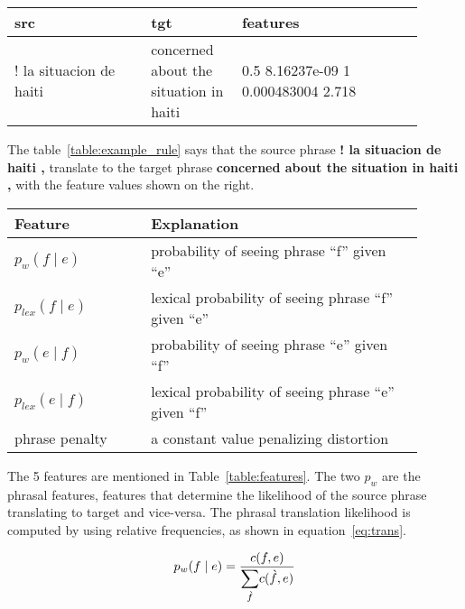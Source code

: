 \begin{table*}[ht]
\small
\small
\centering
\begin{tabular}{p{0.3\linewidth}p{0.2\linewidth}p{0.4\linewidth}}
\toprule
src & tgt & features \\
\toprule
! la situacion de haiti & concerned about the situation in haiti & 0.5 8.16237e-09 1 0.000483004 2.718 \\
\bottomrule
\end{tabular}
\caption{Example of a phrase pair in the Haitian Kreyol to English table}
\label{table:example_rule}
\end{table*}

The table~\ref{table:example_rule}  says that the source phrase \textbf{! la situacion de haiti ,} translate to the target phrase \textbf{concerned about the situation in haiti ,} with the feature values shown on the right. 

\begin{table*}
	\small
	\small
	\begin{tabular}{p{0.3\linewidth}p{0.6\linewidth}}
	\toprule
	Feature &  Explanation \\
	\toprule
	$p_{w}(f \mid e)$ & probability of seeing phrase ``f'' given ``e'' \\
	$p_{lex}(f \mid e)$ & lexical probability of seeing phrase ``f'' given ``e'' \\
	$p_{w}(e \mid f)$ & probability of seeing phrase ``e'' given ``f'' \\
	$p_{lex}(e \mid f)$ & lexical probability of seeing phrase ``e'' given ``f'' \\
   	phrase penalty & a constant value penalizing distortion \\
	\bottomrule
	\end{tabular}
	\caption{Features of the phrase pairs, where ``f'' is foreign/source \& ``e'' is target/english}
	\label{table:features}
\end{table*}

The 5 features are mentioned in Table~\ref{table:features}. The two $p_{w}$ are the phrasal features, features that determine the likelihood of the source phrase translating to target and vice-versa. The phrasal translation likelihood is computed by using relative frequencies, as shown in equation~\eqref{eq:trans}.

\begin{equation} \label{eq:trans}
	p_{w}(f \mid e) = \frac{c(f, e)}{\mathlarger{\sum\limits_{\grave{f}}}c(\grave{f}, e)}
\end{equation}

